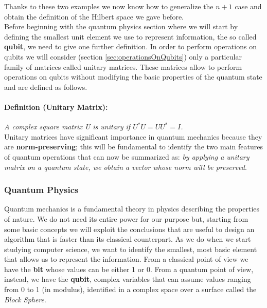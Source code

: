 \documentclass[english]{article}
\begin{document}
			Thanks to these two examples we now know how to generalize the $n + 1$ case and obtain the definition of the Hilbert space we gave before. \\
			
			Before beginning with the quantum physics section where we will start by defining the smallest unit element we use to represent information, the so called \textbf{qubit}, we need to give one further definition. In order to perform operations on qubits we will consider (section \ref{sec:operationsOnQubits}) only a particular family of matrices called unitary matrices. These matrices allow to perform operations on qubits without modifying the basic properties of the quantum state and are defined as follows.
			
			\paragraph{Definition (Unitary Matrix):} \emph{A complex square matrix U is unitary if $U^{*}U = UU^{*} = I$.} \\
			
			Unitary matrices have significant importance in quantum mechanics because they are \textbf{norm-preserving}; this will be fundamental to identify the two main features of quantum operations that can now be summarized as: \emph{by applying a unitary matrix on a quantum state, we obtain a vector whose norm will be preserved}.
						
			\subsubsection{Quantum Physics}
			\label{sec:quantumMechanics}
				Quantum mechanics is a fundamental theory in physics describing the properties of nature. We do not need its entire power for our purpose but, starting from some basic concepts we will exploit the conclusions that are useful to design an algorithm that is faster than its classical counterpart. As we do when we start studying computer science, we want to identify the smallest, most basic element that allows us to represent the information. From a classical point of view we have the \textbf{bit} whose values can be either 1 or 0. From a quantum point of view, instead, we have the \textbf{qubit}, complex variables that can assume values ranging from 0 to 1 (in modulus), identified in a complex space over a surface called the \emph{Block Sphere}.
				
\end{document}
